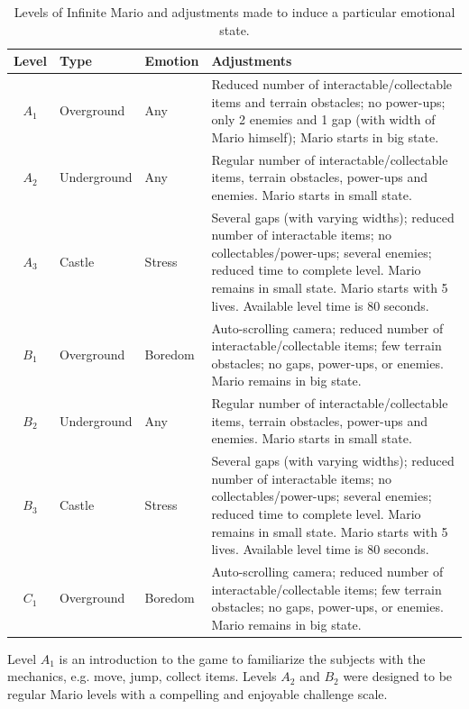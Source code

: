 \begin{landscape}
\begin{table}
    \centering
    \caption{Levels of Infinite Mario and adjustments made to induce a particular emotional state.}
    \label{table:experiment2-mario-levels}
    \begin{tabular}[l]{@{}cllp{9.5cm}}
        \toprule%
            \textbf{Level} & \textbf{Type} & \textbf{Emotion} & \textbf{Adjustments} \\
        \midrule%
            $A_1$ & Overground  & Any & Reduced number of interactable/collectable items and terrain obstacles; no power-ups; only 2 enemies and 1 gap (with width of Mario himself); Mario starts in big state. \\
            $A_2$ & Underground & Any & Regular number of interactable/collectable items, terrain obstacles, power-ups and enemies. Mario starts in small state. \\
            $A_3$ & Castle      & Stress  & Several gaps (with varying widths); reduced number of interactable items; no collectables/power-ups; several enemies; reduced time to complete level. Mario remains in small state. Mario starts with 5 lives. Available level time is 80 seconds. \\
            $B_1$ & Overground  & Boredom & Auto-scrolling camera; reduced number of interactable/collectable items; few terrain obstacles; no gaps, power-ups, or enemies. Mario remains in big state. \\
            $B_2$ & Underground & Any & Regular number of interactable/collectable items, terrain obstacles, power-ups and enemies. Mario starts in small state. \\
            $B_3$ & Castle      & Stress  & Several gaps (with varying widths); reduced number of interactable items; no collectables/power-ups; several enemies; reduced time to complete level. Mario remains in small state. Mario starts with 5 lives. Available level time is 80 seconds. \\
            $C_1$ & Overground  & Boredom & Auto-scrolling camera; reduced number of interactable/collectable items; few terrain obstacles; no gaps, power-ups, or enemies. Mario remains in big state. \\
        \bottomrule%
    \end{tabular}
\end{table}
\end{landscape}

Level $A_1$ is an introduction to the game to familiarize the subjects with the mechanics, e.g. move, jump, collect items. Levels $A_2$ and $B_2$ were designed to be regular Mario levels with a compelling and enjoyable challenge scale.

